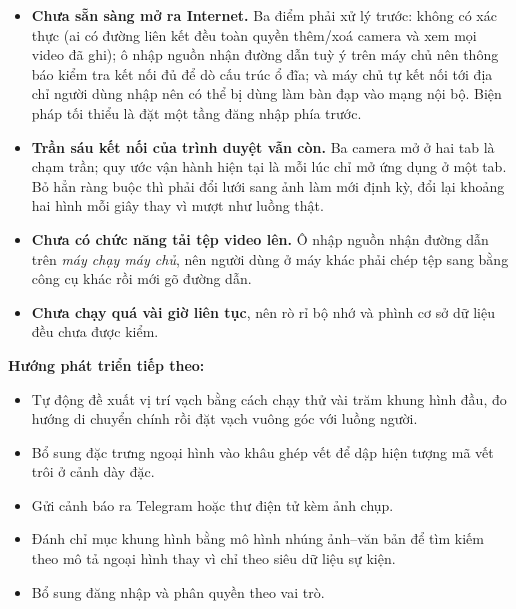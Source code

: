 \begin{itemize}[leftmargin=*, itemsep=2pt]
  \item \textbf{Chưa sẵn sàng mở ra Internet.} Ba điểm phải xử lý trước: không có xác
        thực (ai có đường liên kết đều toàn quyền thêm/xoá camera và xem mọi video đã
        ghi); ô nhập nguồn nhận đường dẫn tuỳ ý trên máy chủ nên thông báo kiểm tra kết
        nối đủ để dò cấu trúc ổ đĩa; và máy chủ tự kết nối tới địa chỉ người dùng nhập
        nên có thể bị dùng làm bàn đạp vào mạng nội bộ. Biện pháp tối thiểu là đặt một
        tầng đăng nhập phía trước.
  \item \textbf{Trần sáu kết nối của trình duyệt vẫn còn.} Ba camera mở ở hai tab là
        chạm trần; quy ước vận hành hiện tại là mỗi lúc chỉ mở ứng dụng ở một tab.
        Bỏ hẳn ràng buộc thì phải đổi lưới sang ảnh
        làm mới định kỳ, đổi lại khoảng hai hình mỗi giây thay vì mượt như luồng thật.
  \item \textbf{Chưa có chức năng tải tệp video lên.} Ô nhập nguồn nhận đường dẫn trên
        \emph{máy chạy máy chủ}, nên người dùng ở máy khác phải chép tệp sang bằng công
        cụ khác rồi mới gõ đường dẫn.
  \item \textbf{Chưa chạy quá vài giờ liên tục}, nên rò rỉ bộ nhớ và phình cơ sở dữ
        liệu đều chưa được kiểm.
\end{itemize}

\textbf{Hướng phát triển tiếp theo:}

\begin{itemize}[leftmargin=*, itemsep=2pt]
  \item Tự động đề xuất vị trí vạch bằng cách chạy thử vài trăm khung hình đầu,
        đo hướng di chuyển chính rồi đặt vạch vuông góc với luồng người.
  \item Bổ sung đặc trưng ngoại hình vào khâu ghép vết để dập hiện tượng mã vết trôi
        ở cảnh dày đặc.
  \item Gửi cảnh báo ra Telegram hoặc thư điện tử kèm ảnh chụp.
  \item Đánh chỉ mục khung hình bằng mô hình nhúng ảnh--văn bản để tìm kiếm theo
        mô tả ngoại hình thay vì chỉ theo siêu dữ liệu sự kiện.
  \item Bổ sung đăng nhập và phân quyền theo vai trò.
\end{itemize}
